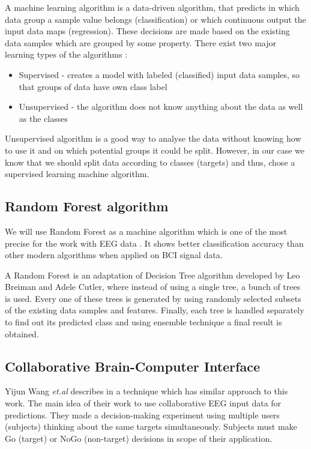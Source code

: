 \documentclass[12pt]{article}
\theoremstyle{definition}
\begin{document}
A machine learning algorithm is a data-driven algorithm, that predicts in which data group a sample value belongs (classification) or which continuous output the input data maps (regression). These decisions are made based on the existing data samples which are grouped by some property. There exist two major learning types of the algorithms \cite{ml_types}:
\begin{itemize}
\item Supervised - creates a model with labeled (classified) input data samples, so that groups of data have own class label
\item Unsupervised - the algorithm does not know anything about the data as well as the classes
\end{itemize}
Unsupervised algorithm is a good way to analyse the data without knowing how to use it and on which potential groups it could be split. However, in our case we know that we should split data according to classes (targets) and thus, chose a supervised learning machine algorithm.

\subsection{Random Forest algorithm}

We will use Random Forest as a machine algorithm which is one of the most precise for the work with EEG data \cite{masso}. It shows better classification accuracy than other modern algorithms when applied on BCI signal data. 

A Random Forest is an adaptation of Decision Tree algorithm developed by Leo Breiman and Adele Cutler, where instead of using a single tree, a bunch of trees is used. Every one of these trees is generated by using randomly selected subsets of the existing data samples and features. Finally, each tree is handled separately to find out its predicted class and using ensemble technique a final result is obtained. \cite{breiman_rf}

\subsection{Collaborative Brain-Computer Interface}

Yijun Wang {\it et.al} describes in \cite{collaborative_wang} a technique which has similar approach to this work. The main idea of their work to use collaborative EEG input data for predictions. They made a decision-making experiment using multiple users (subjects) thinking about the same targets simultaneously. Subjects must make Go (target) or NoGo (non-target) decisions in scope of their application. 
\end{document}
